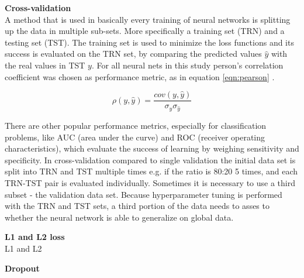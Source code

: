 \textbf{Cross-validation} \\

A method that is used in basically every training of neural networks is splitting up the data in multiple
sub-sets. More specifically a training set (TRN) and a testing set (TST). The training set is used to
minimize the loss functions and its success is evaluated on the TRN set, by comparing the predicted values
$\hat{y}$ with the real values in TST $y$. For all neural nets in this study person's correlation coefficient
was chosen as performance metric, as in equation \ref{eqn:pearson} \cite{soper1917distribution}.

\begin{equation}
\rho(y,\hat{y}) = \frac{cov(y,\hat{y})}{ \sigma_y \sigma_{\hat{y}}}
 \label{eqn:pearson}
\end{equation}

There are other popular performance metrics, especially for classification problems, like AUC (area under the
curve) and ROC (receiver operating characteristics), which evaluate the success of learning by weighing sensitivity and
specificity. In cross-validation compared to single validation the initial data set is split into TRN and TST
multiple times e.g. if the ratio is 80:20 5 times, and each TRN-TST pair is evaluated individually. Sometimes
it is necessary to use a third subset - the validation data set. Because hyperparameter tuning is performed
with the TRN and TST sets, a third portion of the data needs to asses to whether the neural
network is able to generalize on global data.

\textbf{L1 and L2 loss} \\
 
L1 and L2


\textbf{Dropout}



